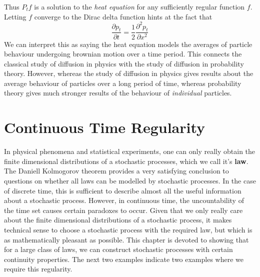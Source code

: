 %
Thus $P_tf$ is a solution to the {\it heat equation} for any sufficiently regular function $f$. Letting $f$ converge to the Dirac delta function hints at the fact that
%
\[ \frac{\partial p_t}{\partial t} = \frac{1}{2} \frac{\partial^2 p_t}{\partial x^2} \]
%
We can interpret this as saying the heat equation models the averages of particle behaviour undergoing brownian motion over a time period. This connects the classical study of diffusion in physics with the study of diffusion in probability theory. However, whereas the study of diffusion in physics gives results about the average behaviour of particles over a long period of time, whereas probability theory gives much stronger results of the behaviour of {\it individual} particles.







\chapter{Continuous Time Regularity}

In physical phenomena and statistical experiments, one can only really obtain the finite dimensional distributions of a stochastic processes, which we call it's {\bf law}. The Daniell Kolmogorov theorem provides a very satisfying conclusion to questions on whether all laws can be modelled by stochastic processes. In the case of discrete time, this is sufficient to describe almost all the useful information about a stochastic process. However, in continuous time, the uncountability of the time set causes certain paradoxes to occur. Given that we only really care about the finite dimensional distributions of a stochastic process, it makes technical sense to choose a stochastic process with the required law, but which is as mathematically pleasant as possible. This chapter is devoted to showing that for a large class of laws, we can construct stochastic processes with certain continuity properties. The next two examples indicate two examples where we require this regularity.

